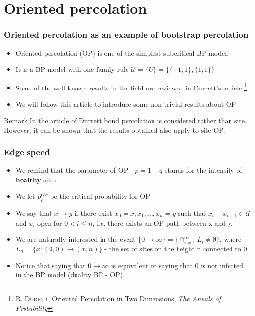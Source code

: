 
\section{Oriented percolation}

\begin{frame}
	\frametitle{Oriented percolation as an example of  bootstrap percolation}
	
\begin{itemize}
\item Oriented percolation (OP) is one of the simplest subcritical BP model.
\item It is a BP model with one-family rule $\mathcal{U} = \{U\} = \{\{-1, 1\}, \{1, 1\}\}$
\item Some of the well-known results in the field are reviewed in Durrett's article \footnote{R. \textsc{Durret}, Oriented Percolation in Two Dimensions, \emph{The Annals of Probability}}
\item We will follow this article to introduce some non-trivial results about OP
\end{itemize}

\begin{alertblock}{Remark}
	In the article of Durrett bond percolation is considered rather than site. However, it can be shown that the results obtained also apply to site OP.
\end{alertblock}

\end{frame}

\begin{frame}
	\frametitle{Edge speed}
	\begin{itemize}
		\item We remind that the parameter of OP - $p = 1 - q$ stands for the intensity of \textbf{healthy} sites
		\item We let $p_{c}^{OP}$ be the critical probability for OP
		\item We say that $x \rightarrow y$  if there exist $x_{0} = x, x_{1}, \ldots, x_{n} = y$ such that $x_{i} - x_{i - 1} \in \mathcal{U}$ and $x_{i}$ open for $0 < i \leq n$, i.e. there exists an OP path between x and y.
		\item We are naturally interested in the event $\{0 \rightarrow \infty \} = \{ \cap_{i = 1}^{\infty} L_{i} \neq \emptyset \}$, where $L_{n} = \{x: (0, 0) \rightarrow (x, n) \}$ - the set of sites on the height n connected to 0.
		\item Notice that saying that $0 \rightarrow \infty$ is equivalent to saying that 0 is not infected in the BP model (duality BP - OP).
	\end{itemize}
\end{frame}
	
